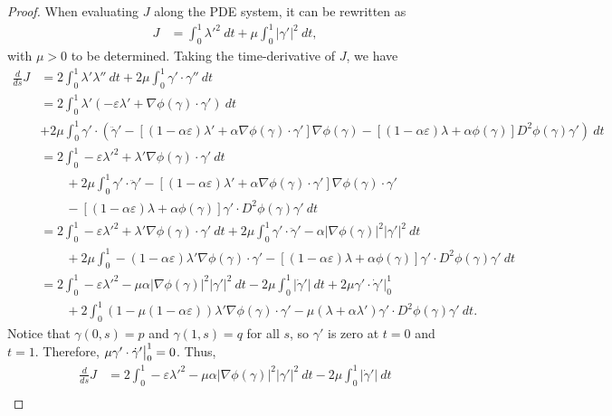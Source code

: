 \documentclass[12pt]{amsart}
\theoremstyle{definition}
\theoremstyle{remark}
\numberwithin{equation}{section}
\numberwithin{equation}{section}
\begin{document}
\begin{proof} When evaluating $J$ along the PDE system, it can be rewritten as 
\begin{align*}
    J & = \int_0^1\lambda'^2~dt+\mu\int_0^1|\gamma'|^2~dt, 
\end{align*}
with $\mu>0$ to be determined. Taking the time-derivative of $J$, we have 
\begin{align*}
     \frac{d}{ds} J & = 2 \int_0^1\lambda'\lambda''~dt + 2 \mu\int_0^1 \gamma'\cdot  \gamma''~dt\\
    & = 2 \int_0^1\lambda'(-\varepsilon\lambda'+\nabla\phi(\gamma)\cdot\gamma')~dt \\ 
    &+ 2 \mu\int_0^1\gamma' \cdot (\ddot{\gamma}'-[(1-\alpha\varepsilon)\lambda'+\alpha \nabla\phi(\gamma)\cdot\gamma']\nabla\phi(\gamma)-[(1-\alpha\varepsilon)\lambda +\alpha\phi(\gamma)]D^2\phi(\gamma)\gamma')~dt\\
    & = 2 \int_0^1-\varepsilon\lambda'^2+\lambda'\nabla\phi(\gamma)\cdot\gamma'~dt \\ 
    & \qquad + 2 \mu\int_0^1\gamma' \cdot \ddot{\gamma}'-[(1-\alpha\varepsilon)\lambda'+\alpha \nabla\phi(\gamma)\cdot\gamma']\nabla\phi(\gamma)\cdot \gamma' \\
    & \qquad -[(1-\alpha\varepsilon)\lambda +\alpha\phi(\gamma)]\gamma'\cdot D^2\phi(\gamma)\gamma'~dt\\
    & = 2 \int_0^1-\varepsilon\lambda'^2+\lambda'\nabla\phi(\gamma)\cdot\gamma'~dt + 2 \mu\int_0^1\gamma' \cdot \ddot{\gamma}'-\alpha |\nabla\phi(\gamma)|^2|\gamma'|^2~dt \\ 
    & \qquad + 2 \mu\int_0^1 -(1-\alpha\varepsilon)\lambda'\nabla\phi(\gamma)\cdot \gamma'  -[(1-\alpha\varepsilon)\lambda +\alpha\phi(\gamma)]\gamma'\cdot D^2\phi(\gamma)\gamma'~dt\\
    & = 2 \int_0^1-\varepsilon\lambda'^2-\mu\alpha |\nabla\phi(\gamma)|^2|\gamma'|^2~dt - 2 \mu\int_0^1|\dot{\gamma}'|~dt+ 2\mu\gamma'\cdot\dot{\gamma}'|_0^1\\ 
    & \qquad + 2 \int_0^1 (1-\mu(1-\alpha\varepsilon))\lambda'\nabla\phi(\gamma)\cdot \gamma'-\mu(\lambda+\alpha\lambda')\gamma'\cdot D^2\phi(\gamma)\gamma'~dt.
\end{align*}
Notice that $\gamma(0, s) = p$ and $\gamma(1, s) = q$ for all $s$, so $\gamma'$ is zero at $t = 0$ and $t = 1$. Therefore, $\mu\gamma' \cdot \dot{\gamma}'\big{|}_0^1 = 0$. 
Thus,
\begin{align*}
    \frac{d}{ds} J & = 2 \int_0^1-\varepsilon\lambda'^2-\mu\alpha |\nabla\phi(\gamma)|^2|\gamma'|^2~dt - 2 \mu\int_0^1|\dot{\gamma}'|~dt\\ 

\end{align*}
\end{proof}
\end{document}
